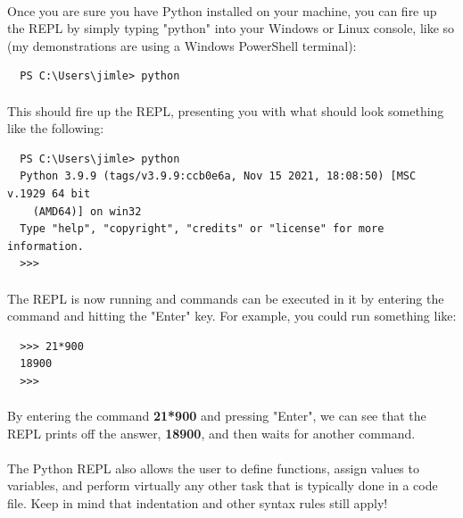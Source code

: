 \documentclass[12pt,a4paper]{article}
\begin{document}
\paragraph{}
Once you are sure you have Python installed on your machine, you can fire up 
the REPL by simply typing "python" into your Windows or Linux console, like 
so (my demonstrations are using a Windows PowerShell terminal):

\begin{verbatim}
  PS C:\Users\jimle> python
\end{verbatim}

\paragraph{}
This should fire up the REPL, presenting you with what should look something 
like the following:

\begin{verbatim}
  PS C:\Users\jimle> python
  Python 3.9.9 (tags/v3.9.9:ccb0e6a, Nov 15 2021, 18:08:50) [MSC v.1929 64 bit 
    (AMD64)] on win32
  Type "help", "copyright", "credits" or "license" for more information.
  >>>
\end{verbatim}

\paragraph{}
The REPL is now running and commands can be executed in it by entering the 
command and hitting the "Enter" key.  For example, you could run something like:

\begin{verbatim}
  >>> 21*900
  18900
  >>>  
\end{verbatim}

\paragraph{}
By entering the command \textbf{21*900} and pressing "Enter", we can see that 
the REPL prints off the answer, \textbf{18900}, and then waits for another 
command.

\paragraph{}
The Python REPL also allows the user to define functions, assign values to 
variables, and perform virtually any other task that is typically done in a 
code file.  Keep in mind that indentation and other syntax rules still apply!
\end{document}
